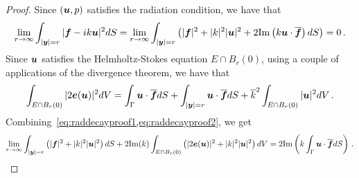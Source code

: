 \begin{proof}
Since $({\boldsymbol u},p)$ satisfies the radiation condition, we have that
\begin{equation}
\lim_{r\to\infty} \int_{|{\boldsymbol y}|=r} | {\boldsymbol f} - i k {\boldsymbol u}|^2 dS = 
\lim_{r\to\infty} \int_{|{\boldsymbol y}| =r} \left( |{\boldsymbol f}|^2 + |k|^2|{\boldsymbol u}|^2 + 2 {\textrm{\textup{Im}}} 
\left( k {\boldsymbol u}\cdot \overline{{\boldsymbol f}} \right) dS \label{eq:raddecayproof1}
\right) = 0 \, . 
\end{equation}
Since ${\boldsymbol u}$ satisfies the Helmholtz-Stokes equation $E \cap B_{r}(0)$,
using a couple of applications of the divergence theorem, we have that
\begin{equation}
\int_{E\cap B_{r}(0)} |2 {\boldsymbol e}({\boldsymbol u})|^2 dV =
\int_{\Gamma} {\boldsymbol u} \cdot \overline{{\boldsymbol f}} dS
+ \int_{|{\boldsymbol y}|=r} {\boldsymbol u} \cdot \overline{{\boldsymbol f}} dS + \overline{k}^2 
\int_{E \cap B_{r}(0)} |{\boldsymbol u}|^2 dV \,. \label{eq:raddecayproof2}
\end{equation}
Combining~\cref{eq:raddecayproof1,eq:raddecayproof2}, we get
\begin{equation}
\lim_{r\to\infty} \int_{|{\boldsymbol y}|=r}\left(|{\boldsymbol f}|^2 + |k|^2 |{\boldsymbol u}|^2 \right) dS 
+ 2 {\textrm{\textup{Im}}}(k)\int_{E \cap B_{r}(0)} \left(|2{\boldsymbol e}({\boldsymbol u})|^2 + |k|^2 |{\boldsymbol u}|^2 
\right) dV = 2{\textrm{\textup{Im}}} \left ( k \int_{\Gamma} {\boldsymbol u} \cdot \overline{{\boldsymbol f}} dS \right) \, .
\end{equation}
\end{proof}

